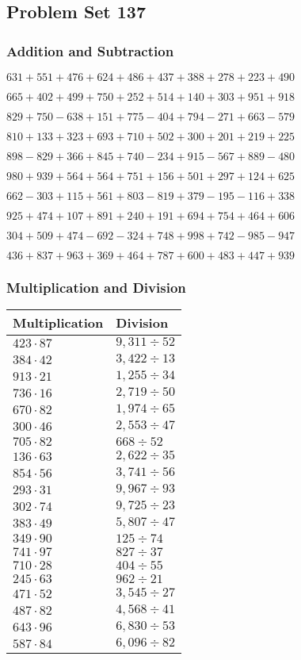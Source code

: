 \hypertarget{problem-set-137}{%
\subsection{Problem Set 137}\label{problem-set-137}}

\hypertarget{addition-and-subtraction}{%
\subsubsection{Addition and
Subtraction}\label{addition-and-subtraction}}

\(631 +551 +476 +624 +486 +437 +388 +278 +223 +490\)

\(665 +402 +499 +750 +252 +514 +140 +303 +951 +918\)

\(829 +750 - 638 +151 +775 - 404 +794 - 271 +663 - 579\)

\(810 +133 +323 +693 +710 +502 +300 +201 +219 +225\)

\(898 - 829 +366 +845 +740 - 234 +915 - 567 +889 - 480\)

\(980 +939 +564 +564 +751 +156 +501 +297 +124 +625\)

\(662 - 303 +115 +561 +803 - 819 +379 - 195 - 116 +338\)

\(925 +474 +107 +891 +240 +191 +694 +754 +464 +606\)

\(304 +509 +474 - 692 - 324 +748 +998 +742 - 985 - 947\)

\(436 +837 +963 +369 +464 +787 +600 +483 +447 +939\)

\hypertarget{multiplication-and-division}{%
\subsubsection{Multiplication and
Division}\label{multiplication-and-division}}

\begin{longtable}[]{@{}ll@{}}
\toprule
Multiplication & Division\tabularnewline
\midrule
\endhead
\(423 \cdot 87\) & \(9,311÷52\)\tabularnewline
\(384 \cdot 42\) & \(3,422÷13\)\tabularnewline
\(913 \cdot 21\) & \(1,255÷34\)\tabularnewline
\(736 \cdot 16\) & \(2,719÷50\)\tabularnewline
\(670 \cdot 82\) & \(1,974÷65\)\tabularnewline
\(300 \cdot 46\) & \(2,553÷47\)\tabularnewline
\(705 \cdot 82\) & \(668÷52\)\tabularnewline
\(136 \cdot 63\) & \(2,622÷35\)\tabularnewline
\(854 \cdot 56\) & \(3,741÷56\)\tabularnewline
\(293 \cdot 31\) & \(9,967÷93\)\tabularnewline
\(302 \cdot 74\) & \(9,725÷23\)\tabularnewline
\(383 \cdot 49\) & \(5,807÷47\)\tabularnewline
\(349 \cdot 90\) & \(125÷74\)\tabularnewline
\(741 \cdot 97\) & \(827÷37\)\tabularnewline
\(710 \cdot 28\) & \(404÷55\)\tabularnewline
\(245 \cdot 63\) & \(962÷21\)\tabularnewline
\(471 \cdot 52\) & \(3,545÷27\)\tabularnewline
\(487 \cdot 82\) & \(4,568÷41\)\tabularnewline
\(643 \cdot 96\) & \(6,830÷53\)\tabularnewline
\(587 \cdot 84\) & \(6,096÷82\)\tabularnewline
\bottomrule
\end{longtable}
